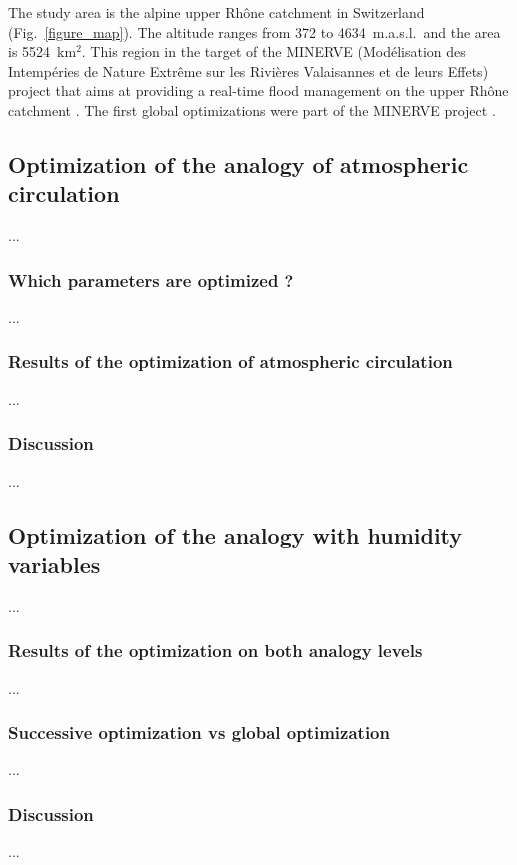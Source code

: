 \documentclass{ametsoc}
\begin{document}
The study area is the alpine upper Rhône catchment in Switzerland (Fig.\ \ref{figure_map}). The altitude ranges from 372 to 4634~m.a.s.l.\ and the area is 5524~km$^{2}$. This region in the target of the MINERVE (Mod\'{e}lisation des Intemp\'{e}ries de Nature Extr\^{e}me sur les Rivi\`{e}res Valaisannes et de leurs Effets) project that aims at providing a real-time flood management on the upper Rh\^{o}ne catchment \citep{GarciaHernandez2009b}. The first global optimizations were part of the MINERVE project \citep{Horton2012, Horton2012a}.


\subsection{Optimization of the analogy of atmospheric circulation}
...

\subsubsection{Which parameters are optimized ?}
...

\subsubsection{Results of the optimization of atmospheric circulation}
...

\subsubsection{Discussion}
...


\subsection{Optimization of the analogy with humidity variables}
...

\subsubsection{Results of the optimization on both analogy levels}
...

\subsubsection{Successive optimization vs global optimization}
...

\subsubsection{Discussion}
...
\end{document}
